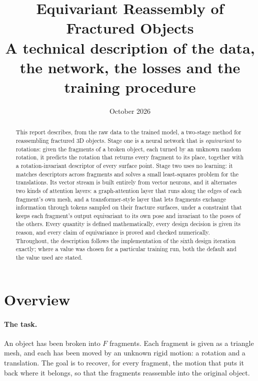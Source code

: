 \documentclass[11pt,a4paper]{article}
\title{\textbf{Equivariant Reassembly of Fractured Objects}\\[4pt]
  \large A technical description of the data, the network, the losses and the training procedure}
\author{}
\date{October 2026}
\theoremstyle{remark}
\begin{document}
\maketitle
\thispagestyle{empty}

\begin{abstract}
\noindent This report describes, from the raw data to the trained model, a two-stage method for reassembling fractured 3D objects. Stage one is a neural network that is \emph{equivariant} to rotations: given the fragments of a broken object, each turned by an unknown random rotation, it predicts the rotation that returns every fragment to its place, together with a rotation-invariant descriptor of every surface point. Stage two uses no learning: it matches descriptors across fragments and solves a small least-squares problem for the translations. Its vector stream is built entirely from vector neurons, and it alternates two kinds of attention layers: a graph-attention layer that runs along the edges of each fragment's own mesh, and a transformer-style layer that lets fragments exchange information through tokens sampled on their fracture surfaces, under a constraint that keeps each fragment's output equivariant to its own pose and invariant to the poses of the others. Every quantity is defined mathematically, every design decision is given its reason, and every claim of equivariance is proved and checked numerically. Throughout, the description follows the implementation of the sixth design iteration exactly; where a value was chosen for a particular training run, both the default and the value used are stated.
\end{abstract}

\tableofcontents
\clearpage

\section{Overview}
\label{sec:overview}

\paragraph{The task.} An object has been broken into $F$ fragments. Each fragment is given as a triangle mesh, and each has been moved by an unknown rigid motion: a rotation and a translation. The goal is to recover, for every fragment, the motion that puts it back where it belongs, so that the fragments reassemble into the original object.
\end{document}

